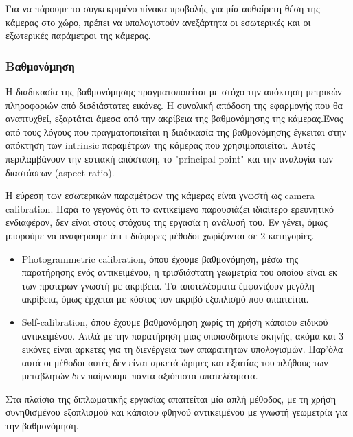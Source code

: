 Για να πάρουμε το συγκεκριμένο πίνακα προβολής για μία αυθαίρετη θέση της κάμερας στο χώρο, πρέπει να υπολογιστούν ανεξάρτητα οι εσωτερικές και οι εξωτερικές παράμετροι της κάμερας. 



\subsubsection{Βαθμονόμηση}



Η διαδικασία της βαθμονόμησης πραγματοποιείται με στόχο την απόκτηση μετρικών πληροφοριών από δισδιάστατες εικόνες. Η συνολική απόδοση της εφαρμογής που θα αναπτυχθεί, εξαρτάται άμεσα από την ακρίβεια της βαθμονόμησης της κάμερας.Ένας από τους λόγους που πραγματοποιείται η διαδικασία της βαθμονόμησης έγκειται στην απόκτηση των intrinsic παραμέτρων της κάμερας που χρησιμοποιείται. Αυτές περιλαμβάνουν την εστιακή απόσταση, το "principal point" και την αναλογία των διαστάσεων (aspect ratio). 


Η εύρεση των εσωτερικών παραμέτρων της κάμερας είναι γνωστή ως camera calibration. Παρά το γεγονός ότι το αντικείμενο παρουσιάζει ιδιαίτερο ερευνητικό ενδιαφέρον, δεν είναι στους στόχους της εργασία η ανάλυσή του. Εν γένει, όμως μπορούμε να αναφέρουμε ότι ι διάφορες μέθοδοι χωρίζονται σε 2 κατηγορίες.

\begin{itemize}
\item Photogrammetric calibration, όπου έχουμε βαθμονόμηση, μέσω της παρατήρησης ενός αντικειμένου, η τρισδιάστατη γεωμετρία του οποίου είναι εκ των προτέρων γνωστή με ακρίβεια. Τα αποτελέσματα έμφανίζουν μεγάλη ακρίβεια, όμως έρχεται με κόστος τον ακριβό εξοπλισμό που απαιτείται.
\item Self-calibration, όπου έχουμε βαθμονόμηση χωρίς τη χρήση κάποιου ειδικού αντικειμένου. Απλά με την παρατήρηση μιας οποιασδήποτε σκηνής, ακόμα και 3 εικόνες είναι αρκετές για τη διενέργεια των απαραίτητων υπολογισμών. Παρ'όλα
αυτά οι μέθοδοι αυτές δεν είναι αρκετά ώριμες και εξαιτίας του πλήθους των μεταβλητών δεν παίρνουμε πάντα αξιόπιστα αποτελέσματα.
\end{itemize}

Στα πλαίσια της διπλωματικής εργασίας απαιτείται μία απλή μέθοδος, με τη χρήση συνηθισμένου εξοπλισμού και κάποιου φθηνού αντικειμένου με γνωστή γεωμετρία για την βαθμονόμηση. 


